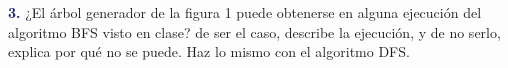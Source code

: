 \newpage
\textbf{\textcolor{MidnightBlue}{3.}}
¿El árbol generador de la figura 1 puede obtenerse en alguna ejecución del algoritmo
BFS visto en clase? de ser el caso, describe la ejecución, y de no serlo, explica por qué no se puede.
Haz lo mismo con el algoritmo DFS.
